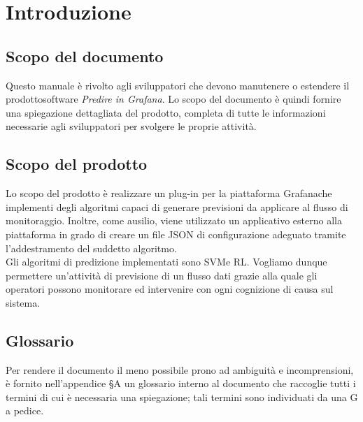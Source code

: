 \section{Introduzione}
\subsection{Scopo del documento}
Questo manuale è rivolto agli sviluppatori che devono manutenere o estendere il prodotto\glosp software \textit{Predire in Grafana}. Lo scopo del documento è quindi fornire una spiegazione dettagliata del prodotto\glo, completa di tutte le informazioni necessarie agli sviluppatori per svolgere le proprie attività.

\subsection{Scopo del prodotto}
Lo scopo del prodotto è realizzare un plug-in per la piattaforma Grafana\glosp che implementi degli algoritmi capaci di generare previsioni da applicare al flusso di monitoraggio. Inoltre, come ausilio, viene utilizzato un applicativo esterno alla piattaforma in grado di creare un file JSON di configurazione adeguato tramite l'addestramento del suddetto algoritmo. \\
Gli algoritmi di predizione implementati sono SVM\glosp e RL\glo.
Vogliamo dunque permettere un'attività di previsione di un flusso dati grazie alla quale gli operatori possono monitorare ed intervenire con ogni cognizione di causa sul sistema.

\subsection{Glossario}
Per rendere il documento il meno possibile prono ad ambiguità e incomprensioni, è fornito nell'appendice §A un glossario interno al documento che raccoglie tutti i termini di cui è necessaria una spiegazione; tali termini sono individuati da una G a pedice.

